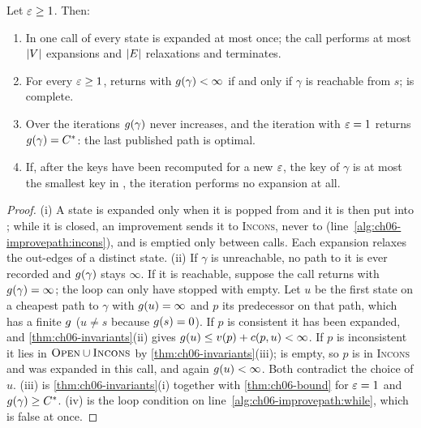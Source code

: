\begin{proposition}
\label{thm:ch06-properties}
Let $\varepsilon \ge 1$. Then:
\begin{enumerate}[label=(\roman*)]
  \item In one call of \AraImprovePath every state is expanded at most once;
        the call performs at most $\left\lvert V \right\rvert$ expansions and $\left\lvert E \right\rvert$
        relaxations and terminates.
  \item For every $\varepsilon \ge 1$, \AraImprovePath returns with $g(\gamma) <
        \infty$ if and only if $\gamma$ is reachable from $s$; \arastar is
        complete.
  \item Over the iterations $g(\gamma)$ never increases, and the
        iteration with $\varepsilon = 1$ returns $g(\gamma) = C^*$: the last
        published path is optimal.
  \item If, after the keys have been recomputed for a new $\varepsilon$, the key of
        $\gamma$ is at most the smallest key in \Open, the iteration performs
        no expansion at all.
\end{enumerate}
\end{proposition}
\begin{proof}
(i) A state is expanded only when it is popped from \Open and it is then put
into \Closed; while it is closed, an improvement sends it to \textsc{Incons},
never to \Open (line~\ref{alg:ch06-improvepath:incons}), and \Closed is
emptied only between calls. Each expansion relaxes the out-edges of a distinct
state. (ii) If $\gamma$ is unreachable, no path to it is ever recorded and
$g(\gamma)$ stays $\infty$. If it is reachable, suppose the call returns
with $g(\gamma) = \infty$; the loop can only have stopped with \Open
empty. Let $u$ be the first state on a cheapest path to $\gamma$ with
$g(u) = \infty$ and $p$ its predecessor on that path, which has a finite
$g$ ($u \ne s$ because $g(s) = 0$). If $p$ is consistent it has been
expanded, and \cref{thm:ch06-invariants}(ii) gives $g(u) \le v(p) +
c(p, u) < \infty$. If $p$ is inconsistent it lies in $\textsc{Open} \cup
\textsc{Incons}$ by \cref{thm:ch06-invariants}(iii); \Open is empty, so $p$
is in \textsc{Incons} and was expanded in this call, and again $g(u) <
\infty$. Both contradict the choice of $u$.
(iii) is \cref{thm:ch06-invariants}(i) together with \cref{thm:ch06-bound} for
$\varepsilon = 1$ and $g(\gamma) \ge C^*$. (iv) is the loop condition on
line~\ref{alg:ch06-improvepath:while}, which is false at once.
\end{proof}

